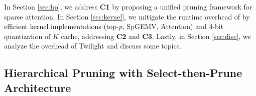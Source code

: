 In Section \ref{sec:hp}, we address \textbf{C1} by proposing a unified pruning framework for sparse attention. In 
 Section \ref{sec:kernel}, we mitigate the runtime overhead of by efficient kernel implementations (top-$p$, SpGEMV, Attention) and 4-bit quantization of $K$ cache, addressing \textbf{C2} and \textbf{C3}. Lastly, in Section \ref{sec:disc}, we analyze the overhead of Twilight and discuss some topics.
\begin{table}[t]
\caption{Comparing of different pruning methods on attention weights. "Normalize" indicates \texttt{softmax}.}
\label{table:prune_cmp}
\begin{center}
\begin{small}
\end{small}
\end{center}
\end{table}

\subsection{Hierarchical Pruning with Select-then-Prune Architecture\label{sec:hp}}


